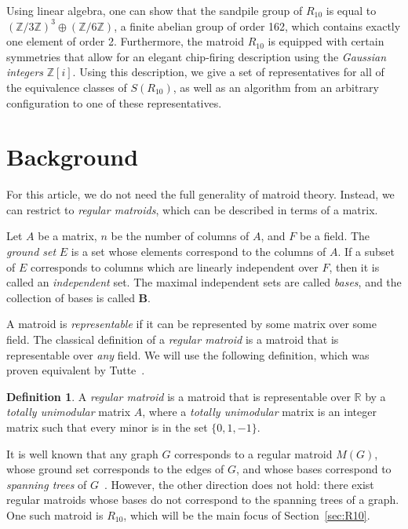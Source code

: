 \documentclass[12p]{amsart}
\numberwithin{equation}{section}
\theoremstyle{plain}
\theoremstyle{definition}
\newtheorem{defn}[thm]{Definition}
\newcommand{\Z}{\mathbb {Z}}
\begin{document}
Using linear algebra, one can show that the sandpile group of $R_{10}$ is equal to $(\Z/3\Z)^3 \oplus (\Z/6\Z)$, a finite abelian group of order 162, which contains exactly one element of order 2. Furthermore, the matroid $R_{10}$ is equipped with certain symmetries that allow for an elegant chip-firing description using the \emph{Gaussian integers} $\Z[i]$. Using this description, we give a set of representatives for all of the equivalence classes of $S(R_{10})$, as well as an algorithm from an arbitrary configuration to one of these representatives. 

\section{Background} 

For this article, we do not need the full generality of matroid theory. Instead, we can restrict to \emph{regular matroids}, which can be described in terms of a matrix.

Let $A$ be a matrix, $n$ be the number of columns of $A$, and $F$ be a field. The \emph{ground set} $E$ is a set whose elements correspond to the columns of $A$. If a subset of $E$ corresponds to columns which are linearly independent over $F$, then it is called an \emph{independent} set. The maximal independent sets are called \emph{bases}, and the collection of bases is called $\mathbf B$.

A matroid is \emph{representable} if it can be represented by some matrix over some field. The classical definition of a \emph{regular matroid} is a matroid that is representable over \emph{any} field. We will use the following definition, which was proven equivalent by Tutte~\cite{Tutte}. 
\begin{defn}
    A \emph{regular matroid} is a matroid that is representable over $\mathbb R$ by a \emph{totally unimodular} matrix $A$, where a \emph{totally unimodular} matrix is an integer matrix such that every minor is in the set $\{0, 1,-1\}$. 
\end{defn}

It is well known that any graph $G$ corresponds to a regular matroid $M(G)$, whose ground set corresponds to the edges of $G$, and whose bases correspond to \emph{spanning trees} of $G$~\cite[Section 5.1]{Oxley}. However, the other direction does not hold: there exist regular matroids whose bases do not correspond to the spanning trees of a graph. One such matroid is $R_{10}$, which will be the main focus of Section~\ref{sec:R10}. 
\end{document}
